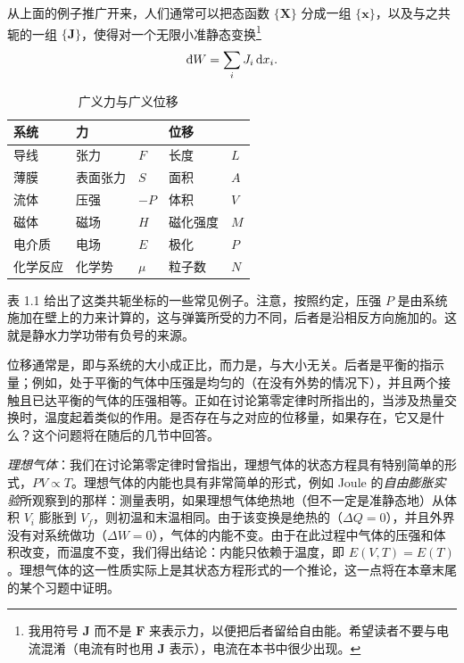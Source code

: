 从上面的例子推广开来，人们通常可以把态函数 $\{\bm{X}\}$ 分成一组 $\{\mathbf{x}\}$，以及与之共轭的一组 $\{\bm{J}\}$，使得对一个无限小准静态变换\footnote{我用符号 $\bm{J}$ 而不是 $\mathbf{F}$ 来表示力，以便把后者留给自由能。希望读者不要与电流混淆（电流有时也用 $\bm{J}$ 表示），电流在本书中很少出现。}
\begin{equation}
\inexd W=\sum_iJ_i\,\mathrm{d}x_i.
\label{eq:1.13}
\end{equation}

\begin{table}[htbp]
  \centering
  \small
  \caption{广义力与广义位移}
  \label{tab:1.1}
  \begin{tabular}{@{}lllll@{}}
    \toprule
    系统 & 力 & & 位移 & \\
    \midrule
    导线 & 张力 & $F$ & 长度 & $L$\\
    薄膜 & 表面张力 & $S$ & 面积 & $A$\\
    流体 & 压强 & $-P$ & 体积 & $V$\\
    磁体 & 磁场 & $H$ & 磁化强度 & $M$\\
    电介质 & 电场 & $E$ & 极化 & $P$\\
    化学反应 & 化学势 & $\mu$ & 粒子数 & $N$\\
    \bottomrule
  \end{tabular}
\end{table}

表 1.1 给出了这类共轭坐标的一些常见例子。注意，按照约定，压强 $P$ 是由系统施加在壁上的力来计算的，这与弹簧所受的力不同，后者是沿相反方向施加的。这就是静水力学功带有负号的来源。

位移通常是，即与系统的大小成正比，而力是，与大小无关。后者是平衡的指示量；例如，处于平衡的气体中压强是均匀的（在没有外势的情况下），并且两个接触且已达平衡的气体的压强相等。正如在讨论第零定律时所指出的，当涉及热量交换时，温度起着类似的作用。是否存在与之对应的位移量，如果存在，它又是什么？这个问题将在随后的几节中回答。

\emph{理想气体}：我们在讨论第零定律时曾指出，理想气体的状态方程具有特别简单的形式，$PV\propto T$。理想气体的内能也具有非常简单的形式，例如 Joule 的\emph{自由膨胀实验}所观察到的那样：测量表明，如果理想气体绝热地（但不一定是准静态地）从体积 $V_i$ 膨胀到 $V_f$，则初温和末温相同。由于该变换是绝热的（$\Delta Q=0$），并且外界没有对系统做功（$\Delta W=0$），气体的内能不变。由于在此过程中气体的压强和体积改变，而温度不变，我们得出结论：内能只依赖于温度，即 $E(V,T)=E(T)$。理想气体的这一性质实际上是其状态方程形式的一个推论，这一点将在本章末尾的某个习题中证明。

